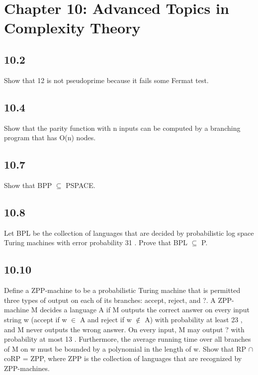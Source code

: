 \section*{Chapter 10: Advanced Topics in Complexity Theory}

\subsection*{10.2}

Show that 12 is not pseudoprime because it fails some Fermat test.


\subsection*{10.4}

Show that the parity function with n inputs can be computed by a branching program that has O(n) nodes.


\subsection*{10.7}

Show that BPP $\subseteq$ PSPACE.


\subsection*{10.8}

Let BPL be the collection of languages that are decided by probabilistic log space Turing machines with error probability 31 . Prove that BPL $\subseteq$ P.


\subsection*{10.10}

Define a ZPP-machine to be a probabilistic Turing machine that is permitted three types of output on each of its branches: accept, reject, and ?. A ZPP-machine M decides a language A if M outputs the correct answer on every input string w (accept if w $\in$ A and reject if w $\notin$ A) with probability at least 23 , and M never outputs the wrong answer. On every input, M may output ? with probability at most 13 . Furthermore, the average running time over all branches of M on w must be bounded by a polynomial in the length of w. Show that RP $\cap$ coRP = ZPP, where ZPP is the collection of languages that are recognized by ZPP-machines.


